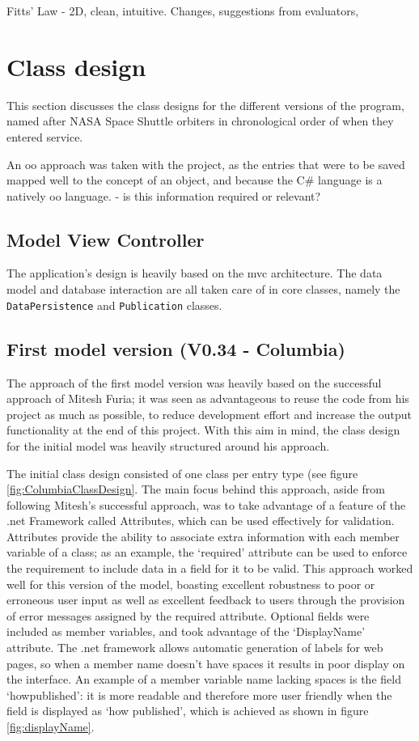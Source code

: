 Fitts' Law - 2D, clean, intuitive. Changes, suggestions from evaluators, 

\section{Class design}
This section discusses the class designs for the different versions of the program, named after NASA Space Shuttle orbiters in chronological order of when they entered service.

An \gls{oo} approach was taken with the project, as the entries that were to be saved mapped well to the concept of an object, and because the C\# language is a natively \gls{oo} language. \revisit - is this information required or relevant? %

\subsection{Model View Controller}
The application's design is heavily based on the \gls{mvc} architecture.  The data model and database interaction are all taken care of in core classes, namely the \texttt{DataPersistence} and \texttt{Publication} classes.

\subsection{First model version (V0.34 - Columbia)}
The approach of the first model version was heavily based on the successful approach of Mitesh Furia; it was seen as advantageous to reuse the code from his project as much as possible, to reduce development effort and increase the output functionality at the end of this project.  With this aim in mind, the class design for the initial model was heavily structured around his approach.

The initial class design consisted of one class per entry type (see figure \ref{fig:ColumbiaClassDesign}.  The main focus behind this approach, aside from following Mitesh's successful approach, was to take advantage of a feature of the .\gls{net} Framework called Attributes, which can be used effectively for validation.  Attributes provide the ability to associate extra information with each member variable of a class; as an example, the `required' attribute can be used to enforce the requirement to include data in a field for it to be valid.  This approach worked well for this version of the model, boasting excellent robustness to poor or erroneous user input as well as excellent feedback to users through the provision of error messages assigned by the required attribute.  Optional fields were included as member variables, and took advantage of the `DisplayName' attribute. The .\gls{net} framework allows automatic generation of labels for web pages, so when a member name doesn't have spaces it results in poor display on the interface.  An example of a member variable name lacking spaces is the field `howpublished': it is more readable and therefore more user friendly when the field is displayed as `how published', which is achieved as shown in figure \ref{fig:displayName}.

